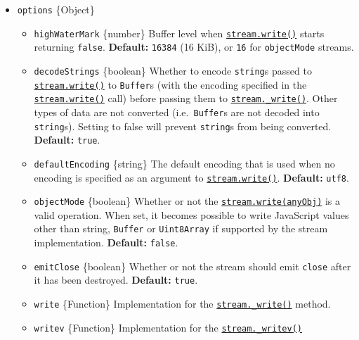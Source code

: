 \begin{itemize}
\tightlist
\item
  \texttt{options} \{Object\}

  \begin{itemize}
  \tightlist
  \item
    \texttt{highWaterMark} \{number\} Buffer level when
    \hyperref[writablewritechunk-encoding-callback]{\texttt{stream.write()}}
    starts returning \texttt{false}. \textbf{Default:} \texttt{16384}
    (16 KiB), or \texttt{16} for \texttt{objectMode} streams.
  \item
    \texttt{decodeStrings} \{boolean\} Whether to encode
    \texttt{string}s passed to
    \hyperref[writablewritechunk-encoding-callback]{\texttt{stream.write()}}
    to \texttt{Buffer}s (with the encoding specified in the
    \hyperref[writablewritechunk-encoding-callback]{\texttt{stream.write()}}
    call) before passing them to
    \hyperref[writable_writechunk-encoding-callback]{\texttt{stream.\_write()}}.
    Other types of data are not converted (i.e.~\texttt{Buffer}s are not
    decoded into \texttt{string}s). Setting to false will prevent
    \texttt{string}s from being converted. \textbf{Default:}
    \texttt{true}.
  \item
    \texttt{defaultEncoding} \{string\} The default encoding that is
    used when no encoding is specified as an argument to
    \hyperref[writablewritechunk-encoding-callback]{\texttt{stream.write()}}.
    \textbf{Default:} \texttt{\textquotesingle{}utf8\textquotesingle{}}.
  \item
    \texttt{objectMode} \{boolean\} Whether or not the
    \hyperref[writablewritechunk-encoding-callback]{\texttt{stream.write(anyObj)}}
    is a valid operation. When set, it becomes possible to write
    JavaScript values other than string, \texttt{Buffer} or
    \texttt{Uint8Array} if supported by the stream implementation.
    \textbf{Default:} \texttt{false}.
  \item
    \texttt{emitClose} \{boolean\} Whether or not the stream should emit
    \texttt{\textquotesingle{}close\textquotesingle{}} after it has been
    destroyed. \textbf{Default:} \texttt{true}.
  \item
    \texttt{write} \{Function\} Implementation for the
    \hyperref[writable_writechunk-encoding-callback]{\texttt{stream.\_write()}}
    method.
  \item
    \texttt{writev} \{Function\} Implementation for the
    \hyperref[writable_writevchunks-callback]{\texttt{stream.\_writev()}}

\end{itemize}
\end{itemize}
